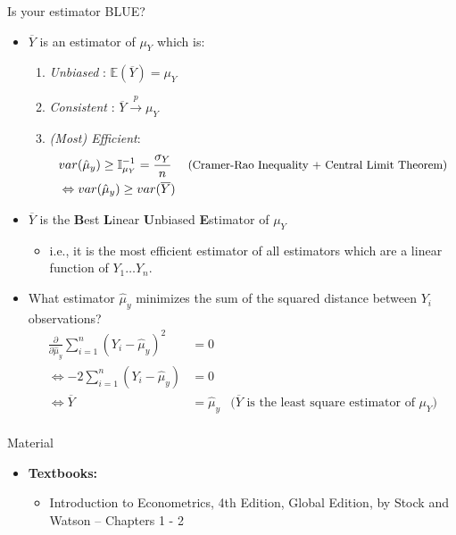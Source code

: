 \documentclass[notes,10pt, aspectratio=169]{beamer}
\begin{document}
\begin{frame}{Is your estimator BLUE?}
\begin{itemize}
    \item $\overline{Y}$ is an estimator of  $\mu_Y$ which is:
    \begin{enumerate}
        \item \textit{Unbiased} : $\mathbb{E}(\overline{Y}) = \mu_Y$
        \item \textit{Consistent} : $\overline{Y}\xrightarrow{\mathit{p}}\mu_Y$
        \item \textit{(Most) Efficient}: \begin{eqnarray*}
        & var(\hat{\mu}_y)\geq \mathbb{I}_{\mu_Y}^{-1} = \frac{\sigma_Y}{n} &\text{\small (Cramer-Rao Inequality + Central Limit Theorem)}\\
        & \Leftrightarrow var(\hat{\mu}_y)\geq var(\overline{Y})
        \end{eqnarray*}
    \end{enumerate}
    \item $\overline{Y}$ is the \textbf{B}est \textbf{L}inear \textbf{U}nbiased \textbf{E}stimator of  $\mu_Y$
    \begin{itemize}
        \item i.e., it is the most efficient estimator of all estimators which are a linear function of $Y_1\dots Y_n$.
    \end{itemize}
    \item What estimator $\hat{\mu}_y$ minimizes the sum of the squared distance between $Y_i$ observations?
        \begin{eqnarray*}
            \frac{\partial}{\partial\hat{\mu}_y} \sum_{i=1}^n (Y_i- \hat{\mu}_y)^2 &=0\\
           \Leftrightarrow -2\sum_{i=1}^n (Y_i- \hat{\mu}_y)&=0\\
           \Leftrightarrow \overline{Y}&=\hat{\mu}_y & \text{($\overline{Y}$ is the least square estimator of $\mu_Y$)}\\
        \end{eqnarray*}
    \end{itemize}
\end{frame}


\begin{frame}[allowframebreaks]{Material}
\begin{itemize}
    \item[--] \textbf{Textbooks:}
    \begin{itemize}
        \item Introduction to Econometrics, 4th Edition, Global Edition, by Stock and Watson -- Chapters 1 - 2
    \end{itemize}
\end{itemize}
\end{frame}
\end{document}
